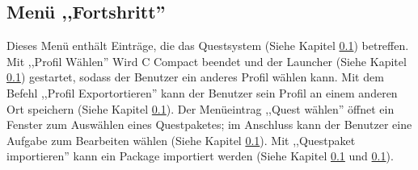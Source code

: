 \subsection{Menü ,,Fortshritt''}
Dieses Menü enthält Einträge, die das Questsystem (Siehe Kapitel \ref{}) betreffen. Mit ,,Profil Wählen'' Wird C Compact beendet und der Launcher (Siehe Kapitel \ref{}) gestartet, sodass der Benutzer ein anderes Profil wählen kann. Mit dem Befehl ,,Profil Exportortieren'' kann der Benutzer sein Profil an einem anderen Ort speichern (Siehe Kapitel \ref{}). Der Menüeintrag ,,Quest wählen'' öffnet ein Fenster zum Auswählen eines Questpaketes; im Anschluss kann der Benutzer eine Aufgabe zum Bearbeiten wählen (Siehe Kapitel \ref{}). Mit ,,Questpaket importieren'' kann ein Package importiert werden (Siehe Kapitel \ref{} und \ref{}).

